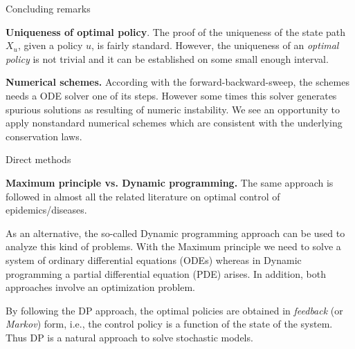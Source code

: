 \begin{frame}{Concluding remarks}
    
    {\bf Uniqueness of optimal policy}.
    The proof of the uniqueness of the state path $X_u$, given a policy $u$, is
    fairly standard. However, the uniqueness of an 
    {\it optimal policy} is not trivial and it can be established on some small 
    enough interval.
    
    {\bf Numerical schemes.}
    According with the forward-backward-sweep, the 
    schemes needs a ODE solver one of its steps. However some times this solver 
    generates spurious solutions as resulting of numeric instability. 
    We see an opportunity to  apply nonstandard numerical schemes which are consistent with 
    the underlying conservation laws.
    
    Direct methods
\end{frame}
\begin{frame}{}
    
    {\bf Maximum principle vs. Dynamic programming.} 
    The same approach is followed in almost all the related literature on optimal
    control of epidemics/diseases.
    
     As an alternative, the so-called Dynamic
    programming approach can be used to analyze this kind of problems. With the
    Maximum principle we need to solve a system of ordinary differential equations
    (ODEs) whereas in Dynamic programming a partial differential equation (PDE)
    arises. In addition, both approaches involve an optimization problem. 
        
    By following the DP approach, the optimal policies are obtained in {\it feedback} (or {\it Markov}) form, i.e., the control policy is a function of the state of the system. Thus DP is a natural approach to solve stochastic models.
\end{frame}